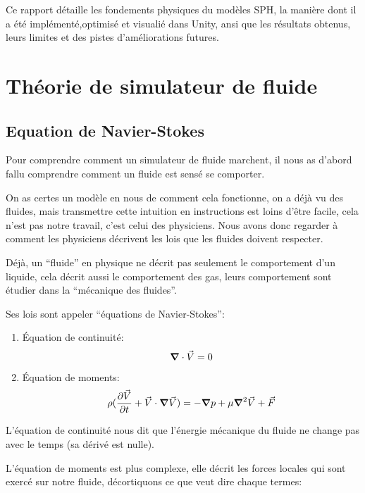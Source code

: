 \documentclass{article}
\begin{document}
Ce rapport détaille les fondements physiques du modèles SPH, la manière dont il a été implémenté,optimisé et visualié dans Unity, ansi que les résultats obtenus, leurs limites et des pistes d'améliorations futures.

\section{Théorie de simulateur de fluide}
\subsection{Equation de Navier-Stokes}
Pour comprendre comment un simulateur de fluide marchent, il nous as d'abord fallu comprendre comment un fluide est sensé se comporter.

On as certes un modèle en nous de comment cela fonctionne, on a déjà vu des fluides, mais transmettre cette intuition en instructions est loins d'être facile, cela n'est pas notre travail, c'est celui des physiciens. Nous avons donc regarder à comment les physiciens décrivent les lois que les fluides doivent respecter.

Déjà, un ``fluide'' en physique ne décrit pas seulement le comportement d'un liquide, cela décrit aussi le comportement des gas, leurs comportement sont étudier dans la ``mécanique des fluides''.

Ses lois sont appeler ``équations de Navier-Stokes'':

\begin{enumerate}
    \item Équation de continuité:
        \[
            \grad \cdot \vec{V} = 0
        \]
    \item Équation de moments:
        \[
            \rho (\pdv{\vec{V}}{t} + \vec{V}\cdot \grad \vec{V}) = - \grad p  + \mu \grad ^ 2 \vec{V} + \vec{F}
        \]
\end{enumerate}

L'équation de continuité nous dit que l'énergie mécanique du fluide ne change pas avec le temps (sa dérivé est nulle).

L'équation de moments est plus complexe, elle décrit les forces locales qui sont exercé sur notre fluide, décortiquons ce que veut dire chaque termes:
\end{document}
